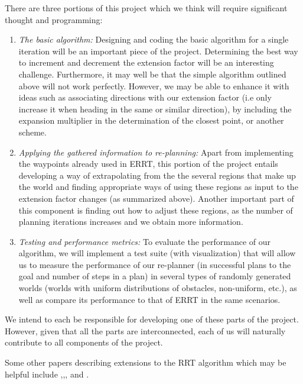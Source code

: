 \documentclass[10pt]{amsart}
\begin{document}
There are three portions of this project which we think will require significant thought and programming:
\begin{enumerate}
\item {\it The basic algorithm:}  Designing and coding the basic algorithm for a single iteration will be an important piece of the project.  Determining the best way to increment and decrement the extension factor will be an interesting challenge.  Furthermore, it may well be that the simple algorithm outlined above will not work perfectly.  However, we may be able to enhance it with ideas such as associating directions with our extension factor (i.e only increase it when heading in the same or similar direction), by including the expansion multiplier in the determination of the closest point, or another scheme.
\item {\it Applying the gathered information to re-planning:} Apart from implementing the waypoints already used in ERRT, this portion of the project entails developing a way of extrapolating from the the several regions that make up the world and finding appropriate ways of using these regions as input to the extension factor changes (as summarized above). Another important part of this component is finding out how to adjust these regions, as the number of planning iterations increases and we obtain more information.

\item {\it Testing and performance metrics:} To evaluate the performance of our algorithm, we will implement a test suite (with visualization) that will allow us to measure the performance of our re-planner (in successful plans to the goal and number of steps in a plan) in several types of randomly generated worlds (worlds with uniform distributions of obstacles, non-uniform, etc.), as well as compare its performance to that of ERRT in the same
scenarios.
\end{enumerate}

We intend to each be responsible for developing one of these parts of the project. However, given that all the parts are interconnected, each of us
will naturally contribute to all components of the project.



Some other papers describing extensions to the RRT algorithm which may be helpful include \cite{Lavalle98rapidly-exploringrandom},\cite{Lindemann04incrementallyreducing},\cite{Jaillet05adaptivetuning}, and \cite{moplan2009}.
{}

\end{document}
